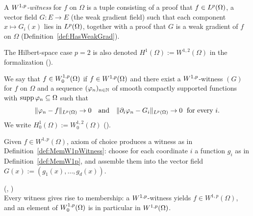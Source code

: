 \begin{definition}
\label{def:MemW1pWitness}
\leanok
{}
A \emph{$W^{1,p}$-witness} for $f$ on $\Omega$ is a tuple consisting of a
proof that $f \in L^{p}(\Omega)$, a vector field $G : E \to E$ (the weak
gradient field) such that each component $x \mapsto G_i(x)$ lies in
$L^{p}(\Omega)$, together with a proof that $G$ is a weak gradient of $f$ on
$\Omega$ (Definition~\ref{def:HasWeakGrad}).
\end{definition}

The Hilbert-space case $p = 2$ is also denoted $H^1(\Omega) := W^{1,2}(\Omega)$
in the formalization ().

\begin{definition}
\label{def:MemW01p}
\leanok
{}
We say that $f \in W_0^{1,p}(\Omega)$ if $f \in W^{1,p}(\Omega)$ and there
exist a $W^{1,p}$-witness $(G)$ for $f$ on $\Omega$ and a sequence
$(\varphi_n)_{n\in\mathbb{N}}$ of smooth compactly supported functions with
$\operatorname{supp}\varphi_n \subseteq \Omega$ such that
\begin{equation*}
  \|\varphi_n - f\|_{L^{p}(\Omega)} \to 0
  \quad\text{and}\quad
  \|\partial_i \varphi_n - G_i\|_{L^{p}(\Omega)} \to 0
  \;\text{ for every } i.
\end{equation*}
We write $H_0^1(\Omega) := W_0^{1,2}(\Omega)$ ().
\end{definition}

\begin{remark}
Given $f \in W^{1,p}(\Omega)$, axiom of choice produces a witness as in
Definition~\ref{def:MemW1pWitness}: choose for each coordinate $i$ a function
$g_i$ as in Definition~\ref{def:MemW1p}, and assemble them into the vector
field $G(x) := (g_1(x),\ldots,g_d(x))$.
\end{remark}

\begin{lemma}
\label{lem:forgetting-witness}
\leanok
{}
(,
)\\
Every witness gives rise to membership: a $W^{1,p}$-witness yields
$f \in W^{1,p}(\Omega)$, and an element of $W_0^{1,p}(\Omega)$ is in particular
in $W^{1,p}(\Omega)$.
\end{lemma}

